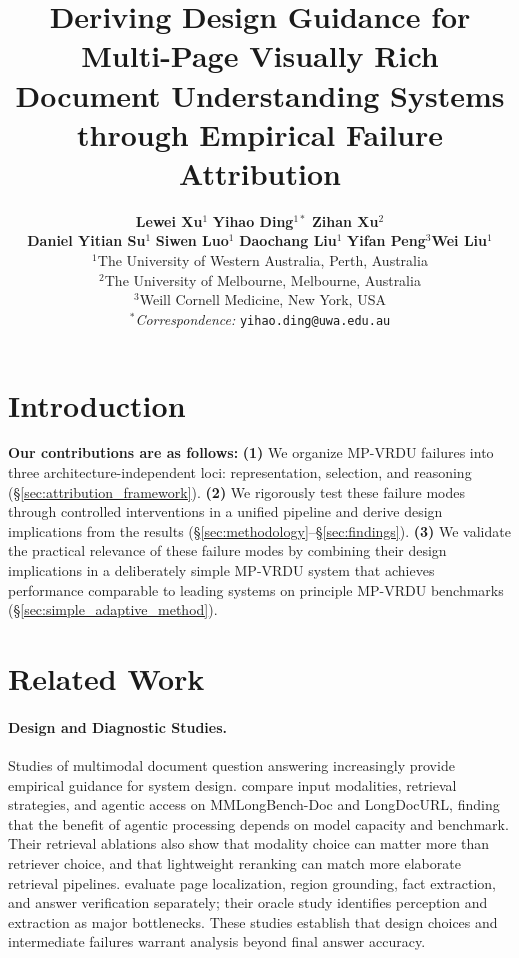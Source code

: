 \documentclass[11pt]{article}
\title{Deriving Design Guidance for Multi-Page Visually Rich Document Understanding Systems through Empirical Failure Attribution}
\author{
  \textbf{Lewei Xu}$^{1}$ \quad \textbf{Yihao Ding}$^{1*}$ \quad \textbf{Zihan Xu}$^2$ \\ \quad \textbf{Daniel Yitian Su$^{1}$} \quad
  \textbf{Siwen Luo}$^1$ \quad \textbf{Daochang Liu}$^1$ \quad \textbf{Yifan Peng}$^{3}$\quad \textbf{Wei Liu}$^1$ \\[4pt]
  $^1$The University of Western Australia, Perth, Australia \\[2pt]
  $^2$The University of Melbourne, Melbourne, Australia \\[2pt]
  $^{3}$Weill Cornell Medicine, New York, USA \\[2pt]
  $^*$\textit{Correspondence:}
  \texttt{yihao.ding@uwa.edu.au}
}
\begin{document}
\maketitle

\begin{abstract}

\end{abstract}

\section{Introduction}






\clearpage

\textbf{Our contributions are as follows:} \textbf{(1)} We organize MP-VRDU failures into three architecture-independent loci: representation, selection, and reasoning (\S\ref{sec:attribution_framework}). \textbf{(2)} We rigorously test these failure modes through controlled interventions in a unified pipeline and derive design implications from the results (\S\ref{sec:methodology}--\S\ref{sec:findings}). \textbf{(3)} We validate the practical relevance of these failure modes by combining their design implications in a deliberately simple MP-VRDU system that achieves performance comparable to leading systems on principle MP-VRDU benchmarks (\S\ref{sec:simple_adaptive_method}).

\section{Related Work}
\label{sec:related_work}

\paragraph{Design and Diagnostic Studies.} Studies of multimodal document question answering increasingly provide empirical guidance for system design. \citeauthor{ak2026empirical} compare input modalities, retrieval strategies, and agentic access on MMLongBench-Doc and LongDocURL, finding that the benefit of agentic processing depends on model capacity and benchmark. Their retrieval ablations also show that modality choice can matter more than retriever choice, and that lightweight reranking can match more elaborate retrieval pipelines. \citeauthor{feng2026docscope} evaluate page localization, region grounding, fact extraction, and answer verification separately; their oracle study identifies perception and extraction as major bottlenecks. These studies establish that design choices and intermediate failures warrant analysis beyond final answer accuracy.
\end{document}
